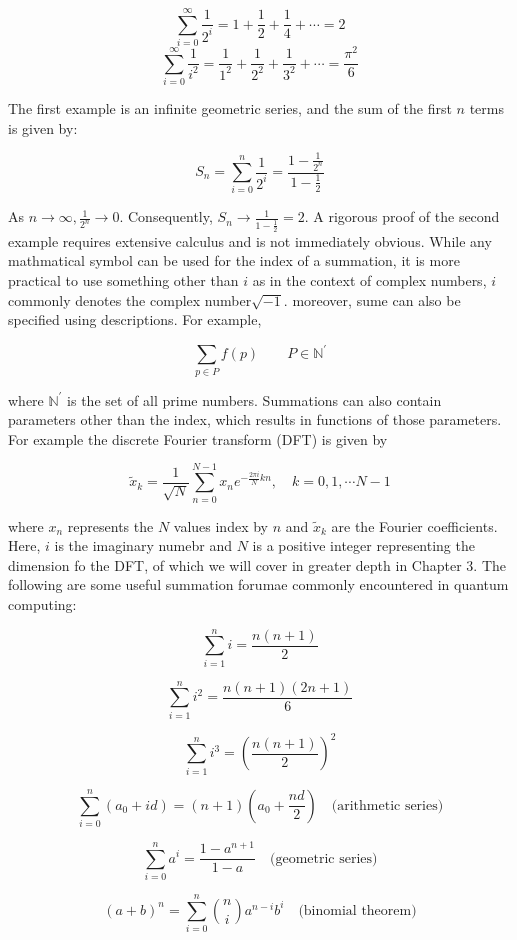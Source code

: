 \documentclass[12pt]{article}
\theoremstyle{plain}
\theoremstyle{definition}
\begin{document}
$$\sum_{i=0}^{\infty} \frac{1}{2^i} = 1 + \frac{1}{2} + \frac{1}{4} + \cdots = 2$$
$$\sum_{i=0}^{\infty}  \frac{1}{i^2} = \frac{1}{1^2} + \frac{1}{2^2} + \frac{1}{3^2} + \cdots = \frac{\pi^2}{6}$$

The first example is an infinite geometric series, and the sum of the first $n$ terms is given by:

$$S_n = \sum_{i=0}^{n} \frac{1}{2^i} = \frac{1 - \frac{1}{2^n}}{1 - \frac{1}{2}}$$

As $n \rightarrow \infty, \frac{1}{2^n} \rightarrow 0$. Consequently, $S_n \rightarrow \frac{1}{1 - \frac{1}{2}} = 2$. A rigorous proof of the second example requires extensive calculus and is not immediately obvious. While any mathmatical symbol can be used for the index of a summation, it is more practical to use something other than $i$ as in the context of complex numbers, $i$ commonly denotes the complex number$\sqrt{-1}$. moreover, sume can also be specified using descriptions. For example, 

$$\sum_{p \in P} f(p) \qquad P \in \mathbb{N^\prime}$$

where $\mathbb{N^\prime}$ is the set of all prime numbers. Summations can also contain parameters other than the index, which results in functions of those parameters. For example the discrete Fourier transform (DFT) is given by

$$\tilde{x}_k = \frac{1}{\sqrt{N}} \sum_{n=0}^{N - 1} x_n e^{- \frac{2 \pi i}{N} kn}, \quad k = 0, 1, \cdots N-1$$

where $x_n$ represents the $N$ values index by $n$ and $\tilde{x}_k$ are the Fourier coefficients. Here, $i$ is the imaginary numebr and $N$ is a positive integer representing the dimension fo the DFT, of which we will cover in greater depth in Chapter 3. The following are some useful summation forumae commonly encountered in quantum computing:

\[
\sum_{i=1}^{n} i = \frac{n(n+1)}{2}
\]

\[
\sum_{i=1}^{n} i^2 = \frac{n(n+1)(2n+1)}{6}
\]

\[
\sum_{i=1}^{n} i^3 = \left(\frac{n(n+1)}{2}\right)^2
\]

\[
\sum_{i=0}^{n} \left(a_0 + id\right) = (n+1)\left(a_0 + \frac{nd}{2}\right) \quad \text{(arithmetic series)}
\]

\[
\sum_{i=0}^{n} a^i = \frac{1 - a^{n+1}}{1 - a} \quad \text{(geometric series)}
\]

\[
(a + b)^n = \sum_{i=0}^{n} \binom{n}{i} a^{n-i} b^i \quad \text{(binomial theorem)}
\]
\end{document}
